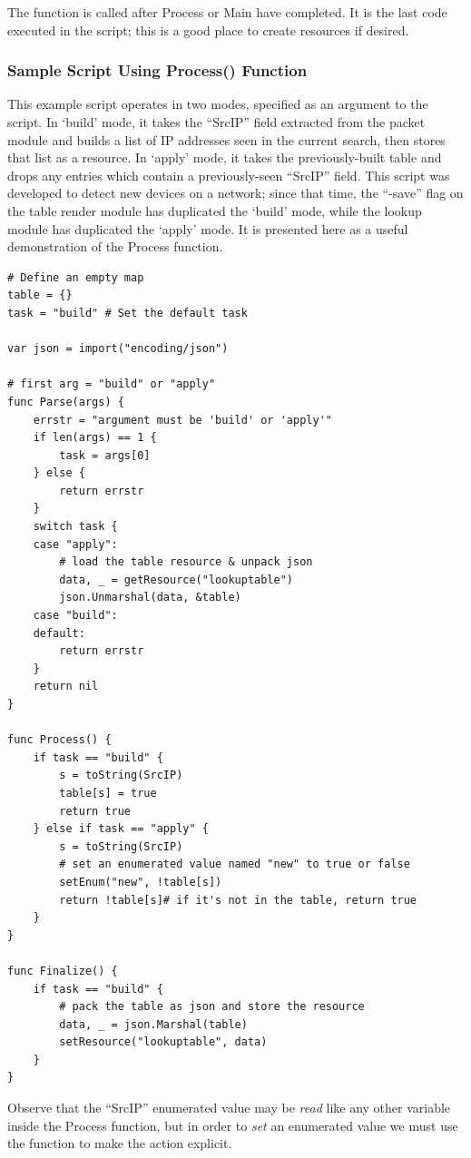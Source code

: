 The  function is called after Process or Main have
completed. It is the last code executed in the script; this is a good
place to create resources if desired.

\subsubsection{Sample Script Using Process() Function}

This example script operates in two modes, specified as an argument to
the script. In `build' mode, it takes the ``SrcIP'' field extracted from
the packet module and builds a list of IP addresses seen in the current
search, then stores that list as a resource. In `apply' mode, it takes
the previously-built table and drops any entries which contain a
previously-seen ``SrcIP'' field. This script was developed to detect new
devices on a network; since that time, the ``-save'' flag on the table
render module has duplicated the `build' mode, while the lookup module
has duplicated the `apply' mode. It is presented here as a useful
demonstration of the Process function.

\begin{Verbatim}[breaklines=true]
# Define an empty map
table = {}
task = "build" # Set the default task

var json = import("encoding/json")

# first arg = "build" or "apply"
func Parse(args) {
    errstr = "argument must be 'build' or 'apply'"
    if len(args) == 1 {
        task = args[0]
    } else {
        return errstr
    }
    switch task {
    case "apply":
        # load the table resource & unpack json
        data, _ = getResource("lookuptable")
        json.Unmarshal(data, &table)
    case "build":
    default:
        return errstr
    }
    return nil
}

func Process() {
    if task == "build" {
        s = toString(SrcIP)
        table[s] = true
        return true
    } else if task == "apply" {
        s = toString(SrcIP)
        # set an enumerated value named "new" to true or false
        setEnum("new", !table[s]) 
        return !table[s]# if it's not in the table, return true
    }
}

func Finalize() {
    if task == "build" {
        # pack the table as json and store the resource
        data, _ = json.Marshal(table)
        setResource("lookuptable", data)
    }
}
\end{Verbatim}

Observe that the ``SrcIP'' enumerated value may be \emph{read} like any
other variable inside the Process function, but in order to \emph{set} an
enumerated value we must use the  function to make the action
explicit.

